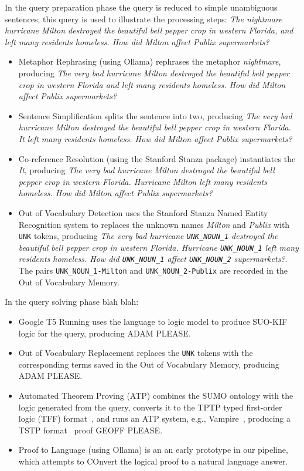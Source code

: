 \documentclass[runningheads]{llncs}
\begin{document}
In the query preparation phase the query is reduced to simple unambiguous sentences; this query 
is used to illustrate the processing steps:
\emph{The nightmare hurricane Milton destroyed the beautiful bell pepper crop in western Florida, 
and left many residents homeless. How did Milton affect Publix supermarkets?}
\begin{itemize}
\item Metaphor Rephrasing (using Ollama) rephrases the metaphor \emph{nightmare}, producing 
      \emph{The very bad hurricane Milton destroyed the beautiful bell pepper crop in western 
      Florida and left many residents homeless. How did Milton affect Publix supermarkets?}
\item Sentence Simplification splits the sentence into two, producing \emph{The very bad 
      hurricane Milton destroyed the beautiful bell pepper crop in western Florida. It left many 
      residents homeless. How did Milton affect Publix supermarkets?}
\item Co-reference Resolution (using the Stanford Stanza package) instantiates the \emph{It}, 
      producing \emph{The very bad hurricane Milton destroyed the beautiful bell pepper crop in 
      western Florida. Hurricane Milton left many residents homeless. How did Milton affect 
      Publix supermarkets?}
\item Out of Vocabulary Detection uses the Stanford Stanza Named Entity Recognition system to
      replaces the unknown names \emph{Milton} and \emph{Publix} with \texttt{UNK} tokens, 
      producing \emph{The very bad hurricane \texttt{UNK\_NOUN\_1} destroyed the beautiful bell 
      pepper crop in western Florida. Hurricane \texttt{UNK\_NOUN\_1} left many residents homeless.
      How did \texttt{UNK\_NOUN\_1} affect \texttt{UNK\_NOUN\_2} supermarkets?}.
      The pairs \texttt{UNK\_NOUN\_1-Milton} and \texttt{UNK\_NOUN\_2-Publix} are recorded in the 
      Out of Vocabulary Memory.
\end{itemize}

In the query solving phase blah blah:
\begin{itemize}
\item Google T5 Running uses the language to logic model to produce SUO-KIF logic for the query,
      producing ADAM PLEASE.
\item Out of Vocabulary Replacement replaces the \texttt{UNK} tokens with the corresponding terms
      saved in the Out of Vocabulary Memory, producing ADAM PLEASE.
\item Automated Theorem Proving (ATP) combines the SUMO ontology with the logic generated from the
      query, converts it to the TPTP typed first-order logic (TFF) format~\cite{Sut23-IGPL},
      and runs an ATP system, e.g., Vampire~\cite{KV13}, producing a TSTP format~\cite{SZS04} 
      proof GEOFF PLEASE.
\item Proof to Language (using Ollama) is an an early prototype in our pipeline, which attempts 
      to COnvert the logical proof to a natural language answer.
\end{itemize}
\end{document}
